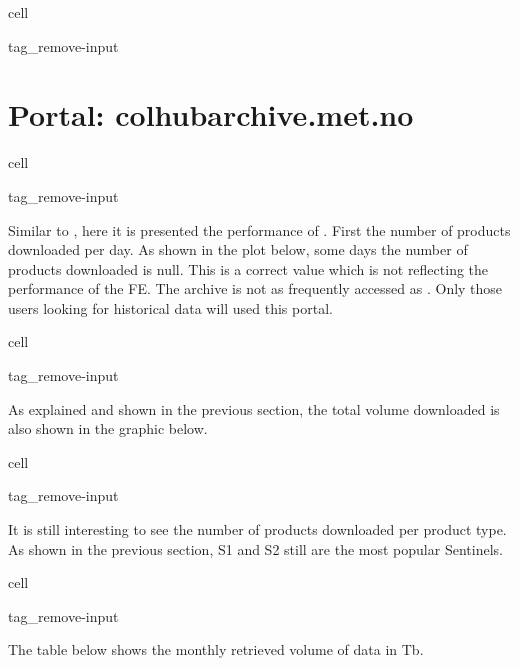\documentclass[letterpaper,10pt,english]{jupyterBook}
\begin{document}
\begin{sphinxuseclass}{cell}
\begin{sphinxuseclass}{tag_remove-input}
\end{sphinxuseclass}
\end{sphinxuseclass}

\section{Portal: colhub\sphinxhyphen{}archive.met.no}
\label{\detokenize{user_downloads:portal-colhub-archive-met-no}}
\begin{sphinxuseclass}{cell}
\begin{sphinxuseclass}{tag_remove-input}
\end{sphinxuseclass}
\end{sphinxuseclass}
\sphinxAtStartPar
Similar to , here it is presented the performance of . First the number of products downloaded per day. As shown in the plot below, some days the number of products downloaded is null. This is a correct value which is not reflecting the performance of the FE. The archive is not as frequently accessed as . Only those users looking for historical data will used this portal.

\begin{sphinxuseclass}{cell}
\begin{sphinxuseclass}{tag_remove-input}
\end{sphinxuseclass}
\end{sphinxuseclass}
\sphinxAtStartPar
As explained and shown in the previous section, the total volume downloaded is also shown in the graphic below.

\begin{sphinxuseclass}{cell}
\begin{sphinxuseclass}{tag_remove-input}
\end{sphinxuseclass}
\end{sphinxuseclass}
\sphinxAtStartPar
It is still interesting to see the number of products downloaded per product type. As shown in the previous section, S1 and S2 still are the most popular Sentinels.

\begin{sphinxuseclass}{cell}
\begin{sphinxuseclass}{tag_remove-input}
\end{sphinxuseclass}
\end{sphinxuseclass}
\sphinxAtStartPar
The table below shows the monthly retrieved volume of data in Tb.
\end{document}
